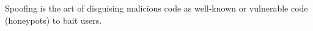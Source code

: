 Spoofing is the art of disguising malicious code as well-known or vulnerable code (honeypots) to bait users.
